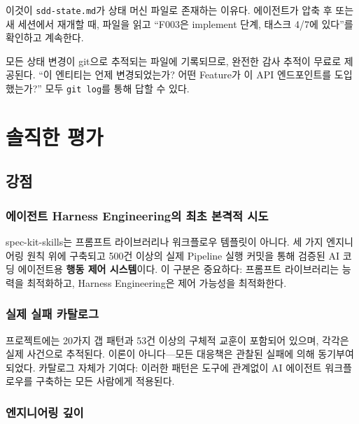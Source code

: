 \documentclass[11pt,a4paper,openright,twoside]{report}
\newcommand{\file}[1]{\texttt{#1}}
\begin{document}
이것이 \file{sdd-state.md}가 상태 머신 파일로 존재하는 이유다. 에이전트가 압축 후 또는 새 세션에서 재개할 때, 파일을 읽고 ``F003은 implement 단계, 태스크 4/7에 있다''를 확인하고 계속한다.

\begin{notebox}
모든 상태 변경이 git으로 추적되는 파일에 기록되므로, 완전한 감사 추적이 무료로 제공된다. ``이 엔티티는 언제 변경되었는가? 어떤 Feature가 이 API 엔드포인트를 도입했는가?'' 모두 \texttt{git log}를 통해 답할 수 있다.
\end{notebox}


\chapter{솔직한 평가}
\label{ch:assessment}

\section{강점}

\subsection{에이전트 Harness Engineering의 최초 본격적 시도}

spec-kit-skills는 프롬프트 라이브러리나 워크플로우 템플릿이 아니다. 세 가지 엔지니어링 원칙 위에 구축되고 500건 이상의 실제 Pipeline 실행 커밋을 통해 검증된 AI 코딩 에이전트용 \textbf{행동 제어 시스템}이다. 이 구분은 중요하다: 프롬프트 라이브러리는 능력을 최적화하고, Harness Engineering은 제어 가능성을 최적화한다.

\subsection{실제 실패 카탈로그}

프로젝트에는 20가지 갭 패턴과 53건 이상의 구체적 교훈이 포함되어 있으며, 각각은 실제 사건으로 추적된다. 이론이 아니다---모든 대응책은 관찰된 실패에 의해 동기부여되었다. 카탈로그 자체가 기여다: 이러한 패턴은 도구에 관계없이 AI 에이전트 워크플로우를 구축하는 모든 사람에게 적용된다.

\subsection{엔지니어링 깊이}
\end{document}
